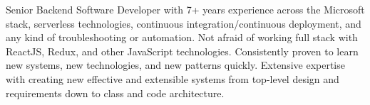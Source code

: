 \par{
    Senior Backend Software Developer with 7+ years experience across the Microsoft stack, serverless technologies, continuous integration/continuous deployment, and any kind of troubleshooting or automation. Not afraid of working full stack with ReactJS, Redux, and other JavaScript technologies. Consistently proven to learn new systems, new technologies, and new patterns quickly. Extensive expertise with creating new effective and extensible systems from top-level design and requirements down to class and code architecture.
}